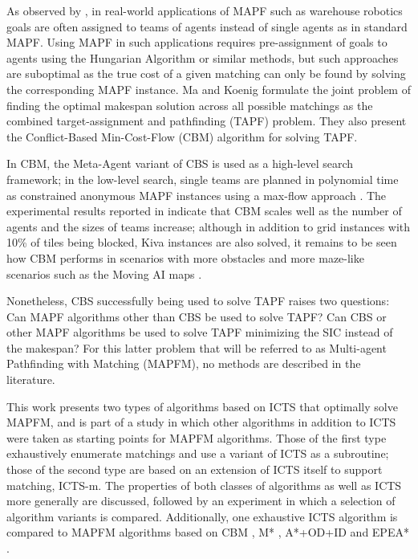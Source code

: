 \documentclass[english]{article}
\begin{document}
	As observed by \cite{ma2016b}, in real-world applications of MAPF such as warehouse robotics \cite{wurman2007} goals are often assigned to teams of agents instead of single agents as in standard MAPF. Using MAPF in such applications requires pre-assignment of goals to agents using the Hungarian Algorithm \cite{kuhn55} or similar methods, but such approaches are suboptimal as the true cost of a given matching can only be found by solving the corresponding MAPF instance. Ma and Koenig \cite{ma2016} formulate the joint problem of finding the optimal makespan solution across all possible matchings as the combined target-assignment and pathfinding (TAPF) problem. They also present the Conflict-Based Min-Cost-Flow (CBM) algorithm for solving TAPF. 
	
	In CBM, the Meta-Agent variant of CBS \cite{sharon2015} is used as a high-level search framework; in the low-level search, single teams are planned in polynomial time as constrained anonymous MAPF instances using a max-flow approach \cite{yu2013}. The experimental results reported in \cite{ma2016} indicate that CBM scales well as the number of agents and the sizes of teams increase; although in addition to grid instances with 10\% of tiles being blocked, Kiva \cite{wurman2007} instances are also solved, it remains to be seen how CBM performs in scenarios with more obstacles and more maze-like scenarios such as the Moving AI maps \cite{sturtevant2012}.
	
	Nonetheless, CBS successfully being used to solve TAPF raises two questions: Can MAPF algorithms other than CBS be used to solve TAPF? Can CBS or other MAPF algorithms be used to solve TAPF minimizing the SIC instead of the makespan? For this latter problem that will be referred to as Multi-agent Pathfinding with Matching (MAPFM), no methods are described in the literature. 
	
	This work presents two types of algorithms based on ICTS \cite{sharon2013} that optimally solve MAPFM, and is part of a study in which other algorithms in addition to ICTS were taken as starting points for MAPFM algorithms. Those of the first type exhaustively enumerate matchings and use a variant of ICTS as a subroutine; those of the second type are based on an extension of ICTS itself to support matching, ICTS-m. The properties of both classes of algorithms as well as ICTS more generally are discussed, followed by an experiment in which a selection of algorithm variants is compared. Additionally, one exhaustive ICTS algorithm is compared to MAPFM algorithms based on CBM \cite{ma2016}, M* \cite{wagner2011}, A*+OD+ID \cite{standley2010} and EPEA* \cite{goldenberg2014}. 
	
\end{document}
